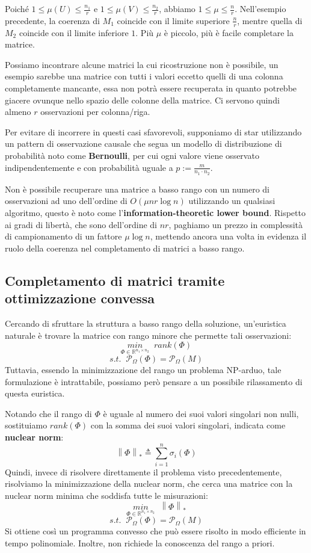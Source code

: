 \documentclass[12pt,a4paper]{report}
\newcommand{\nukenorm}[1]{\left\lVert#1\right\rVert _*}
\begin{document}
Poiché $1\leq \mu(U) \leq \frac{n_1}{r}$
e $1\leq \mu(V) \leq \frac{n_2}{r}$, abbiamo $1\leq \mu \leq \frac{n}{r}$.
Nell'esempio precedente, la coerenza di $M_1$ coincide con il limite superiore
$\frac{n}{r}$, mentre quella di $M_2$ coincide con il limite inferiore $1$.
Più $\mu$ è piccolo, più è facile completare la matrice.

Possiamo incontrare alcune matrici la cui ricostruzione non è possibile,
un esempio sarebbe una matrice con tutti i valori eccetto quelli di una colonna completamente
mancante, essa non potrà essere recuperata in quanto potrebbe giacere ovunque nello
spazio delle colonne della matrice.
Ci servono quindi almeno $r$ osservazioni per colonna/riga.

Per evitare di incorrere in questi casi sfavorevoli, supponiamo di star utilizzando
un pattern di osservazione causale che segua un modello di distribuzione di probabilità
noto come \textbf{Bernoulli}, per cui ogni valore viene osservato indipendentemente
e con probabilità uguale a $p := \frac{m}{n_1\cdot n_2}$.

Non è possibile recuperare una matrice a basso rango con un numero di osservazioni
ad uno dell'ordine di $O(\mu n r \log n)$ utilizzando un qualsiasi algoritmo,
questo è noto come l'\textbf{information-theoretic lower bound}.
Rispetto ai gradi di libertà, che sono dell'ordine di $nr$,
paghiamo un prezzo in complessità di campionamento di un fattore $\mu \log n$,
mettendo ancora una volta in evidenza il ruolo della coerenza nel completamento di matrici a basso rango.

\newpage

\subsection{Completamento di matrici tramite ottimizzazione convessa}

Cercando di sfruttare la struttura a basso rango della soluzione, un'euristica naturale
è trovare la matrice con rango minore che permette tali osservazioni:
$$ \underset{\Phi \in \mathbb{R}^{n_1 \times n_2}}{min}\;\; rank(\Phi) $$
$$ s.t. \;\;  \mathcal{P}_{\Omega}(\Phi) = \mathcal{P}_{\Omega}(M) $$ 
Tuttavia, essendo la minimizzazione del rango un problema NP-arduo,
tale formulazione è intrattabile, possiamo però
pensare a un possibile rilassamento di questa euristica.

Notando che il rango di $\Phi$ è uguale al numero dei suoi valori singolari non nulli,
sostituiamo $rank(\Phi)$ con la somma dei suoi valori singolari, indicata come \textbf{nuclear norm}:
$$ \nukenorm{\Phi} \triangleq \sum_{i=1}^n \sigma_i(\Phi) $$
Quindi, invece di risolvere direttamente il problema visto precedentemente,
risolviamo la minimizzazione della nuclear norm, che cerca una matrice con la nuclear norm
minima che soddisfa tutte le misurazioni:
$$ \underset{\Phi \in \mathbb{R}^{n_1 \times n_2}}{min}\;\; \nukenorm{\Phi} $$
$$ s.t. \;\;  \mathcal{P}_{\Omega}(\Phi) = \mathcal{P}_{\Omega}(M) $$ 
Si ottiene così un programma convesso che può
essere risolto in modo efficiente in tempo polinomiale.
Inoltre, non richiede la conoscenza
del rango a priori.
\end{document}
